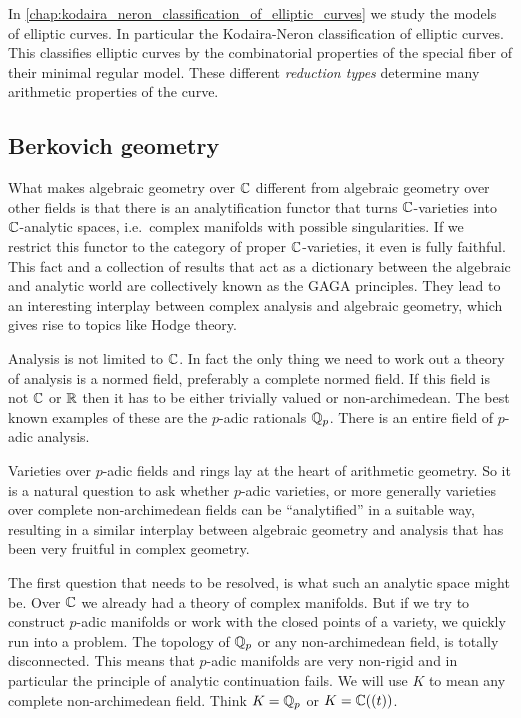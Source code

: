 In \cref{chap:kodaira_neron_classification_of_elliptic_curves} we study the models of elliptic curves. 
In particular the Kodaira-Neron classification of elliptic curves. 
This classifies elliptic curves by the combinatorial properties of the special fiber of their minimal regular model. 
These different \emph{reduction types} determine many arithmetic properties of the curve.

\subsection{Berkovich geometry} \label{sec:berkovich_geometry}
What makes algebraic geometry over $\mathbb{C}$ different from algebraic geometry over other fields is that there is an analytification functor that turns $\mathbb{C}$-varieties into $\mathbb{C}$-analytic spaces, i.e.\ complex manifolds with possible singularities. 
If we restrict this functor to the category of proper  $\mathbb{C}$-varieties, it even is fully faithful. 
This fact and a collection of results that act as a dictionary between the algebraic and analytic world are collectively known as the GAGA principles. 
They lead to an interesting interplay between complex analysis and algebraic geometry, which gives rise to topics like Hodge theory. 

Analysis is not limited to $\mathbb{C}$. 
In fact the only thing we need to work out a theory of analysis is a normed field, preferably a complete normed field. 
If this field is not $\mathbb{C}$ or $\mathbb{R}$ then it has to be either trivially valued or non-archimedean. 
The best known examples of these are the $p$-adic rationals $\mathbb{Q}_p$. 
There is an entire field of $p$-adic analysis.  

Varieties over $p$-adic fields and rings lay at the heart of arithmetic geometry. 
So it is a natural question to ask whether $p$-adic varieties, or more generally varieties over complete non-archimedean fields can be ``analytified'' in a suitable way, resulting in a similar interplay between algebraic geometry and analysis that has been very fruitful in complex geometry. 

The first question that needs to be resolved, is what such an analytic space might be.
Over $\mathbb{C}$ we already had a theory of complex manifolds.
But if we try to construct $p$-adic manifolds or work with the closed points of a variety, we quickly run into a problem.
The topology of $\mathbb{Q}_p$ or any non-archimedean field, is totally disconnected. 
This means that $p$-adic manifolds are very non-rigid and in particular the principle of analytic continuation fails. 
We will use $K$ to mean any complete non-archimedean field. Think $K = \mathbb{Q}_p$ or $K = \mathbb{C}((t))$. 

